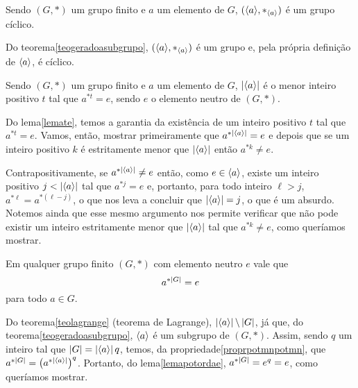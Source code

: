 \begin{Cor}
  Sendo $(G,\ast)$ um grupo finito
  e $a$ um elemento de $G$, $(\langle a\rangle,\ast_{\langle a\rangle})$
  é um grupo cíclico.
\end{Cor}

\begin{dem}
  Do teorema\xspace\ref{teogeradoasubgrupo},
  $(\langle a\rangle,\ast_{\langle a\rangle})$ é um grupo e, pela própria definição
  de $\langle a\rangle$, é cíclico.
\end{dem}

\begin{Lem}\label{lemapotordae}
  Sendo $(G,\ast)$ um grupo finito
  e $a$ um elemento de $G$, $\left| \langle a\rangle \right|$ é
  o menor inteiro positivo $t$ tal que $a^{\ast t}=e$, sendo $e$ o
  elemento neutro de $(G,\ast)$.
\end{Lem}

\begin{dem}
  Do lema\xspace\ref{lemate}, temos a garantia da existência de um
  inteiro positivo $t$ tal que $a^{\ast t}=e$. Vamos, então, mostrar
  primeiramente que
  $a^{\ast \left| \langle a\rangle \right|}=e$ e
  depois que se um inteiro positivo $k$ é
  estritamente menor que $\left| \langle a\rangle \right|$ então $a^{\ast k}\neq e$.

  Contrapositivamente, se $a^{\ast \left| \langle a\rangle \right|}\neq e$ então,
  como $e\in\langle a\rangle$, existe um inteiro
  positivo $j<\left| \langle a\rangle \right|$ tal que $a^{\ast j}=e$ e, portanto,
  para todo inteiro $\ell>j$, $a^{\ast \ell}=a^{\ast (\ell-j)}$, o que
  nos leva a concluir que $\left| \langle a\rangle \right|=j$, o que é um absurdo.
  Notemos ainda que esse mesmo argumento nos permite verificar que não
  pode existir um inteiro estritamente menor que $\left| \langle a\rangle \right|$
  tal que $a^{\ast k}\neq e$, como queríamos mostrar.
\end{dem}

\begin{Teo}\label{teoacardige}
  Em qualquer grupo finito $(G,\ast)$ com elemento neutro $e$
  vale que
  \begin{equation*}
    a^{\ast\left| G \right|} = e
  \end{equation*}
  para todo $a\in G$.
\end{Teo}

\begin{dem}
  Do teorema\xspace\ref{teolagrange} (teorema de Lagrange),
  $\left| \langle a\rangle \right|\backslash \left| G \right|$, já que, do
  teorema\xspace\ref{teogeradoasubgrupo}, $\langle a\rangle$ é um subgrupo de
  $(G,\ast)$. Assim, sendo $q$ um inteiro tal que
  $\left| G \right|=\left| \langle a\rangle \right|q$, temos, da
  propriedade\xspace\ref{proprpotmnpotmn}, que
  $a^{\ast \left| G \right|} = {\bigl(a^{\ast
  \left| \langle a\rangle \right|}\bigr)}^q$. Portanto, do
  lema\xspace\ref{lemapotordae}, $a^{\ast \left| G \right|} = e^q = e$, como
  queríamos mostrar.
\end{dem}

